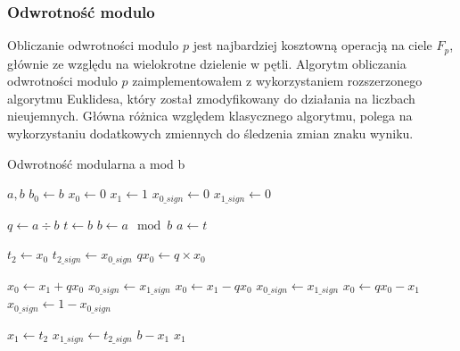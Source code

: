 \subsubsection{Odwrotność modulo}
Obliczanie odwrotności modulo $p$ jest najbardziej kosztowną operacją na ciele $F_{p}$, głównie ze względu
na wielokrotne dzielenie w pętli.
Algorytm obliczania odwrotności modulo $p$ zaimplementowałem z wykorzystaniem rozszerzonego algorytmu Euklidesa,
który został zmodyfikowany do działania na liczbach nieujemnych. Główna różnica względem klasycznego algorytmu,
polega na wykorzystaniu dodatkowych zmiennych do śledzenia zmian znaku wyniku.

\begin{algorithm}[]
    \caption{Odwrotność modularna a mod b}
    \label{alg:inverse}
    \begin{algorithmic}[1]
        \State {} $a, b$
        \State $b_0 \gets b$
        \State $x_0 \gets 0$
        \State $x_1 \gets 1$
        \State $x_{0\_sign} \gets 0$
        \State $x_{1\_sign} \gets 0$

        \State $q \gets a \div b$
        \State $t \gets b$
        \State $b \gets a \mod b$
        \State $a \gets t$

        \State $t_2 \gets x_0$
        \State $t_{2\_sign} \gets x_{0\_sign}$
        \State $qx_0 \gets q \times x_0$

        \State $x_0 \gets x_1 + qx_0$
        \State $x_{0\_sign} \gets x_{1\_sign}$
        \Else
        \State $x_0 \gets x_1 - qx_0$
        \State $x_{0\_sign} \gets x_{1\_sign}$
        \Else
        \State $x_0 \gets qx_0 - x_1$
        \State $x_{0\_sign} \gets 1 - x_{0\_sign}$
        \EndIf
        \EndIf

        \State $x_1 \gets t_2$
        \State $x_{1\_sign} \gets t_{2\_sign}$
        \EndWhile
        \State \Return $b - x_1$
        \Else
        \State \Return $x_1$
        \EndIf

    \end{algorithmic}
\end{algorithm}


